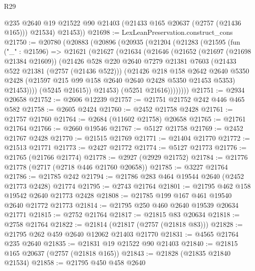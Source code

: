 \begin{lexlean}{R29}
\begin{coremodule}
          @235
          @2640
          @19
          @21522
          @90
          @21403
          (@21433 @165 @20637 (@2757 (@21436 @165)))
          @21534)
        @21453))
@21698 := LexLeanPreservation.construct_cons
@21750 := @20780
    (@20883
      (@20896
        (@20935
          (@21204
            (@21283
              (@21595
                (fun ("_" : @21596) =>
                @21621
                  (@21627
                    (@21634
                      (@21646
                        (@21652
                          (@21697 (@21698 @21384 @21609))
                          (@21426
                            @528
                            @220
                            @2640
                            @7279
                            @21381
                            @7603
                            (@21433 @522 @21381 (@2757 (@21436 @522)))
                            (@21426
                              @218
                              @158
                              @2642
                              @2640
                              @5350
                              @2428
                              (@21597 @215 @99 @158 @2640 @2640 @2428 @5350 @21453 @5353)
                              @21453))))
                      (@5245 @21615))
                    @21453)
                  (@5251 @21616))))))))
@21751 := @2934 @20658
@21752 := @2606 @12239
@21757 := @21751 @21752 @242 @446 @465 @582
@21758 := @2605 @2424
@21760 := @2452 @21758 @2428
@21761 := @21757 @21760
@21764 := @2684 (@11602 @21758) @20658
@21765 := @21761 @21764
@21766 := @2660 @19546
@21767 := @5127 @21758
@21769 := @2452 @21767 @2428
@21770 := @21515 @21769
@21771 := @21404 @21770
@21772 := @21513 @21771
@21773 := @2427 @21772
@21774 := @5127 @21773
@21776 := @21765 (@21766 @21774)
@21778 := @2927 (@2929 @21752)
@21784 := @21776 @21778 (@2717 (@2718 @446 @21760 @20658))
@21785 := @3227 @21764
@21786 := @21785 @242
@21794 := @21786 @283 @464 @19544 @2640 (@2452 @21773 @2428) @21774
@21795 := @2743 @21764
@21801 := @21795 @462 @158 @19542 @2640 @21773 @2428
@21808 := @21785 @199 @167 @461 @19540 @2640 @21772 @21773
@21814 := @21795 @250 @460 @2640 @19539 @20634 @21771
@21815 := @2752 @21764
@21817 := @21815 @83 @20634
@21818 := @2758 @21764
@21822 := @21814 (@21817 (@2757 (@21818 @83)))
@21828 := @21795 @262 @459 @2640 @12062 @21403 @21770
@21831 := @4565 @21764 @235 @2640
@21835 := @21831 @19 @21522 @90 @21403
@21840 := @21815 @165 @20637 (@2757 (@21818 @165))
@21843 := @21828 (@21835 @21840 @21534)
@21858 := @21795
    @450
    @458
    @2640

\end{coremodule}
\end{lexlean}
